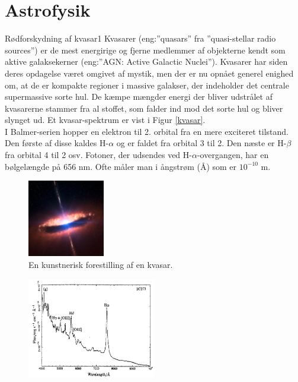 \section*{Astrofysik}
\begin{opgave}{Rødforskydning af kvasar}{1}
	Kvasarer (eng:”quasars” fra ”quasi-stellar radio sources”) er de mest energirige og
	fjerne medlemmer af objekterne kendt som aktive galaksekerner (eng:”AGN: Active
	Galactic Nuclei”). Kvasarer har siden deres opdagelse været omgivet af mystik, men
	der er nu opnået generel enighed om, at de er kompakte regioner i massive galakser,
	der indeholder det centrale supermassive sorte hul. De kæmpe mængder energi der
	bliver udstrålet af kvasarerne stammer fra al stoffet, som falder ind mod det sorte
	hul og bliver slynget ud.
	Et kvasar-spektrum er vist i Figur \ref{kvasar}.
	\\
	I Balmer-serien hopper en elektron til 2. orbital fra en mere exciteret tilstand. Den første af disse kaldes H-$\alpha$ og er faldet fra orbital 3 til 2. Den næste er H-$\beta$ fra orbital 4 til 2 osv. Fotoner, der udsendes ved H-$\alpha$-overgangen, har en bølgelængde på 656 nm. Ofte måler man i ångstrøm (Å) som er $10^{-10}$ m.\\
	\begin{figure}[h!]
		\centering
		\includegraphics[width=0.3\textwidth]{Astrofysik/Astrofig/kvasarkunst.jpg}
		\caption{En kunstnerisk forestilling af en kvasar.} %
		\label{kvasarkunst}
	\end{figure}
	\begin{figure}[h!]
		\centering
		\includegraphics[width=0.5\textwidth]{Astrofysik/Astrofig/kvasar.png}

\end{figure}
\end{opgave}
